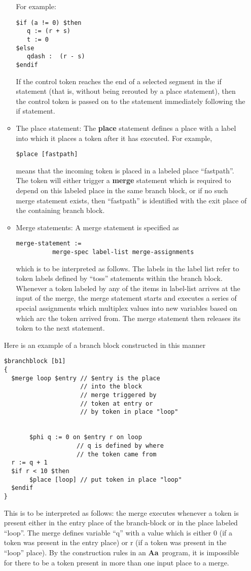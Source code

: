 \documentclass{article}
\newcommand{\Aa}{{\bf Aa}~}
\begin{document}
\begin{itemize}
\begin{itemize}
\begin{verbatim}
\end{verbatim}
For example:
\begin{verbatim}
$if (a != 0) $then
   q := (r + s)
   t := 0
$else
   qdash :  (r - s)
$endif
\end{verbatim}
If the control token reaches the end of a selected
segment in the if statement (that is, without being
rerouted by a place statement), then the control
token is passed on to the statement immediately
following the if statement.
\item The place statement: The {\bf place} statement
defines a place with a label  into which it places
a token after it has executed.  For example,
\begin{verbatim}
$place [fastpath]
\end{verbatim}
means that the incoming token is placed in a labeled
place ``fastpath''.  The token will either
trigger a {\bf merge} statement which is required
to depend on this labeled place in the same branch
block, or if no such merge statement
exists, then ``fastpath'' is identified
with the exit place of the  containing branch block.
\item Merge statements: A merge statement is
specified as 
\begin{verbatim}
merge-statement :=
          merge-spec label-list merge-assignments
\end{verbatim}
which is to be interpreted as follows.  The labels in the label list
refer to token labels defined by ``toss'' statements within the branch block.
Whenever a token labeled by any of the items in label-list arrives
at the input of the merge,
the merge statement starts and executes a series of special assignments
which multiplex values into new variables based on which arc the
token arrived from.  The merge statement then releases its token to
the next statement. 
\end{itemize}

Here is an example of a branch block constructed in this manner
\begin{verbatim}
$branchblock [b1] 
{
  $merge loop $entry // $entry is the place
                     // into the block
                     // merge triggered by
                     // token at entry or
                     // by token in place "loop"


       $phi q := 0 on $entry r on loop 
                    // q is defined by where 
                    // the token came from
  r := q + 1
  $if r < 10 $then 
       $place [loop] // put token in place "loop"
  $endif
}
\end{verbatim}
This is to be interpreted as follows: the merge executes
whenever a token is present  either in the entry place
of the branch-block or in the place labeled ``loop''.
The merge defines variable ``q'' with a value which is
either 0 (if a token was present in the entry place)
or r (if a token was present in the ``loop'' place).
By the construction rules in an \Aa program, it is
impossible for there to be a token present in more
than one input place to a merge.
\end{itemize}
\end{document}
